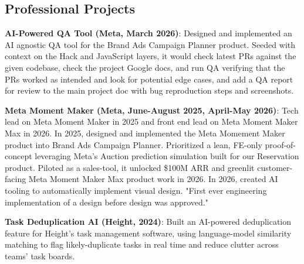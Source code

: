 \documentclass{res}
\begin{document}
\begin{resume}
    \section{Professional Projects}
    {\bf AI-Powered QA Tool (Meta, March 2026)}:
    Designed and implemented an AI agnostic QA tool for the Brand Ads Campaign
    Planner product. Seeded with context on the Hack and JavaScript layers,
    it would check latest PRs against the given codebase, check the project
    Google docs, and run QA verifying that the PRs worked as intended and
    look for potential edge cases, and add a QA report for review to the
    main project doc with bug reproduction steps and screenshots.
    \vspace{-8pt}

    {\bf Meta Moment Maker (Meta, June-August 2025, April-May 2026)}:
    Tech lead on Meta Moment Maker in 2025 and front end lead on Meta Moment
    Maker Max in 2026. In 2025, designed and implemented the Meta Momement
    Maker product into Brand Ads Campaign Planner. Prioritized a lean,
    FE-only proof-of-concept leveraging Meta's Auction prediction
    simulation built for our Reservation product. Piloted as a sales-tool,
    it unlocked \$100M ARR and greenlit customer-facing Meta Moment Maker
    Max product work in 2026. In 2026, created AI tooling to automatically
    implement visual design. "First ever engineering implementation of a
    design before design was approved."
    \vspace{-8pt}

    {\bf Task Deduplication AI (Height, 2024)}:
    Built an AI-powered deduplication feature for Height's task management software, using
    language-model similarity matching to flag likely-duplicate tasks in real time and reduce
    clutter across teams' task boards.
    \vspace{-8pt}


\end{resume}
\end{document}
